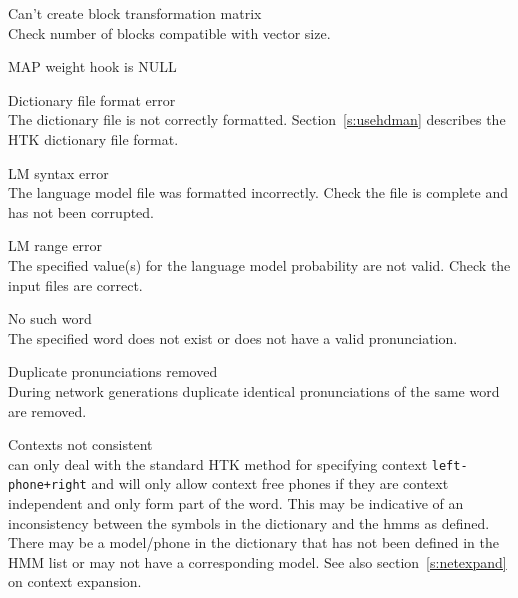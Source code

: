 \begin{itemize}
\begin{itemize}
 Can't create block transformation matrix\\
        Check number of blocks compatible with vector size.

 MAP weight hook is NULL\\

\end{itemize}


\begin{itemize}
    Dictionary file format error\\
        The dictionary file is not correctly formatted.  
        Section~\ref{s:usehdman} describes the HTK dictionary file format.

\end{itemize}


\begin{itemize}
    LM syntax error\\
        The language model file was formatted incorrectly.  Check the file is
        complete and has not been corrupted.

 LM range error\\
        The specified value(s) for the language model probability are not 
        valid.  Check the input files are correct.

\end{itemize}


\begin{itemize}
    No such word\\
        The specified word does not exist or does not have a valid 
        pronunciation.

    Duplicate pronunciations removed\\
        During network generations duplicate identical pronunciations
        of the same word are removed.

    Contexts not consistent\\
         can only deal with the standard HTK method for specifying
        context \texttt{left-phone+right} and will only allow context free 
        phones if they are context independent and only form part of the word.
        This may be indicative of an inconsistency between the symbols in the dictionary
        and the hmms as defined. There may be a model/phone in the dictionary that has 
        not been defined in the HMM list or may not have a corresponding model.
        See also section~\ref{s:netexpand}  on context expansion.



\end{itemize}
\end{itemize}

